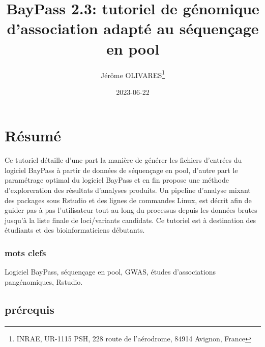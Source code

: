 \documentclass[
  openany]{book}
\title{BayPass 2.3: tutoriel de génomique d'association adapté au séquençage en pool}
\author{Jérôme OLIVARES\footnote{INRAE, UR-1115 PSH, 228 route de l'aérodrome, 84914 Avignon, France}}
\date{2023-06-22}
\begin{document}
\maketitle

{
\hypersetup{linkcolor=}
\setcounter{tocdepth}{1}
\tableofcontents
}
\hypertarget{ruxe9sumuxe9}{%
\chapter*{Résumé}\label{ruxe9sumuxe9}}

Ce tutoriel détaille d'une part la manière de générer les fichiers d'entrées du logiciel BayPass à partir de données de séquençage en pool, d'autre part le paramétrage optimal du logiciel BayPass et en fin propose une méthode d'exploreration des résultats d'analyses produits. Un pipeline d'analyse mixant des packages sous Rstudio et des lignes de commandes Linux, est décrit afin de guider pas à pas l'utilisateur tout au long du processus depuis les données brutes jusqu'à la liste finale de loci/variants candidats.
Ce tutoriel est à destination des étudiants et des bioinformaticiens débutants.

\hypertarget{mots-clefs}{%
\subsection*{mots clefs}\label{mots-clefs}}

Logiciel BayPass, séquençage en pool, GWAS, études d'associations pangénomiques, Rstudio.

\hypertarget{pruxe9requis}{%
\section*{prérequis}\label{pruxe9requis}}
\end{document}
